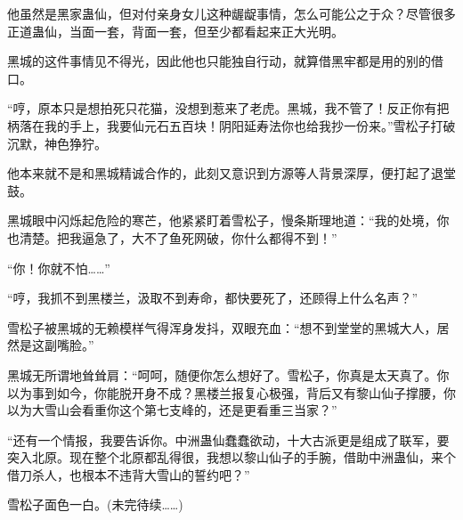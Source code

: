 \begin{this_body}
他虽然是黑家蛊仙，但对付亲身女儿这种龌龊事情，怎么可能公之于众？尽管很多正道蛊仙，当面一套，背面一套，但至少都看起来正大光明。

黑城的这件事情见不得光，因此他也只能独自行动，就算借黑牢都是用的别的借口。

“哼，原本只是想拍死只花猫，没想到惹来了老虎。黑城，我不管了！反正你有把柄落在我的手上，我要仙元石五百块！阴阳延寿法你也给我抄一份来。”雪松子打破沉默，神色狰狞。

他本来就不是和黑城精诚合作的，此刻又意识到方源等人背景深厚，便打起了退堂鼓。

黑城眼中闪烁起危险的寒芒，他紧紧盯着雪松子，慢条斯理地道：“我的处境，你也清楚。把我逼急了，大不了鱼死网破，你什么都得不到！”

“你！你就不怕……”

“哼，我抓不到黑楼兰，汲取不到寿命，都快要死了，还顾得上什么名声？”

雪松子被黑城的无赖模样气得浑身发抖，双眼充血：“想不到堂堂的黑城大人，居然是这副嘴脸。”

黑城无所谓地耸耸肩：“呵呵，随便你怎么想好了。雪松子，你真是太天真了。你以为事到如今，你能脱开身不成？黑楼兰报复心极强，背后又有黎山仙子撑腰，你以为大雪山会看重你这个第七支峰的，还是更看重三当家？”

“还有一个情报，我要告诉你。中洲蛊仙蠢蠢欲动，十大古派更是组成了联军，要突入北原。现在整个北原都乱得很，我想以黎山仙子的手腕，借助中洲蛊仙，来个借刀杀人，也根本不违背大雪山的誓约吧？”

雪松子面色一白。(未完待续……)

\end{this_body}

